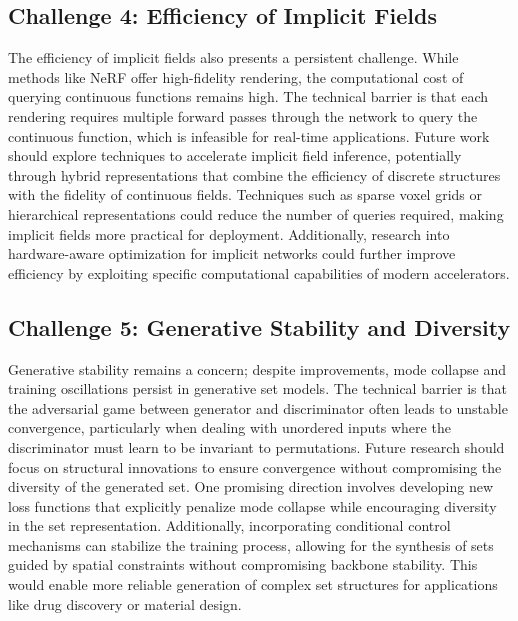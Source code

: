 \documentclass{article}
\begin{document}
\subsection{Challenge 4: Efficiency of Implicit Fields}

\label{sec:challenge_4_efficiency_of_implicit_field}

The efficiency of implicit fields also presents a persistent challenge. While methods like NeRF offer high-fidelity rendering, the computational cost of querying continuous functions remains high. The technical barrier is that each rendering requires multiple forward passes through the network to query the continuous function, which is infeasible for real-time applications. Future work should explore techniques to accelerate implicit field inference, potentially through hybrid representations that combine the efficiency of discrete structures with the fidelity of continuous fields. Techniques such as sparse voxel grids or hierarchical representations could reduce the number of queries required, making implicit fields more practical for deployment. Additionally, research into hardware-aware optimization for implicit networks could further improve efficiency by exploiting specific computational capabilities of modern accelerators.

\subsection{Challenge 5: Generative Stability and Diversity}

\label{sec:challenge_5_generative_stability_and_div}

Generative stability remains a concern; despite improvements, mode collapse and training oscillations persist in generative set models. The technical barrier is that the adversarial game between generator and discriminator often leads to unstable convergence, particularly when dealing with unordered inputs where the discriminator must learn to be invariant to permutations. Future research should focus on structural innovations to ensure convergence without compromising the diversity of the generated set. One promising direction involves developing new loss functions that explicitly penalize mode collapse while encouraging diversity in the set representation. Additionally, incorporating conditional control mechanisms can stabilize the training process, allowing for the synthesis of sets guided by spatial constraints without compromising backbone stability. This would enable more reliable generation of complex set structures for applications like drug discovery or material design.
\end{document}
